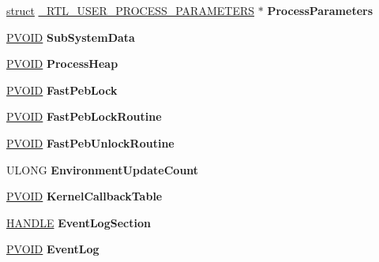 \begin{DoxyCompactItemize}
\hyperlink{interfacestruct}{struct} \hyperlink{struct___r_t_l___u_s_e_r___p_r_o_c_e_s_s___p_a_r_a_m_e_t_e_r_s}{\+\_\+\+R\+T\+L\+\_\+\+U\+S\+E\+R\+\_\+\+P\+R\+O\+C\+E\+S\+S\+\_\+\+P\+A\+R\+A\+M\+E\+T\+E\+RS} $\ast$ {\bfseries Process\+Parameters}
\item 
\mbox{\label{struct___p_e_b_a2534e2305572161aa711a092ddd2da9a}} 
\hyperlink{interfacevoid}{P\+V\+O\+ID} {\bfseries Sub\+System\+Data}
\item 
\mbox{\label{struct___p_e_b_a91273522bbbeb378117f7f386eeae339}} 
\hyperlink{interfacevoid}{P\+V\+O\+ID} {\bfseries Process\+Heap}
\item 
\mbox{\label{struct___p_e_b_afc7a6b7f99c700d1ea4634fc09ca44e7}} 
\hyperlink{interfacevoid}{P\+V\+O\+ID} {\bfseries Fast\+Peb\+Lock}
\item 
\mbox{\label{struct___p_e_b_abc51d7fb5ac9beff9eea832af910ef7c}} 
\hyperlink{interfacevoid}{P\+V\+O\+ID} {\bfseries Fast\+Peb\+Lock\+Routine}
\item 
\mbox{\label{struct___p_e_b_aea6d04359a8edab54ea30971cb1c4955}} 
\hyperlink{interfacevoid}{P\+V\+O\+ID} {\bfseries Fast\+Peb\+Unlock\+Routine}
\item 
\mbox{\label{struct___p_e_b_ad2696ff100f4549a193f9f8a44b6bdee}} 
U\+L\+O\+NG {\bfseries Environment\+Update\+Count}
\item 
\mbox{\label{struct___p_e_b_a4edb2a41eb1fe659133ff585976ec3e0}} 
\hyperlink{interfacevoid}{P\+V\+O\+ID} {\bfseries Kernel\+Callback\+Table}
\item 
\mbox{\label{struct___p_e_b_a602277209fe01e29f75fecc746d84508}} 
\hyperlink{interfacevoid}{H\+A\+N\+D\+LE} {\bfseries Event\+Log\+Section}
\item 
\mbox{\label{struct___p_e_b_a7af9b83a7cb39c9490126ccf475fb7be}} 
\hyperlink{interfacevoid}{P\+V\+O\+ID} {\bfseries Event\+Log}
\item 
\mbox{\label{struct___p_e_b_aea7cf291f76073ce4a32e33c6ceb3637}} 

\end{DoxyCompactItemize}
